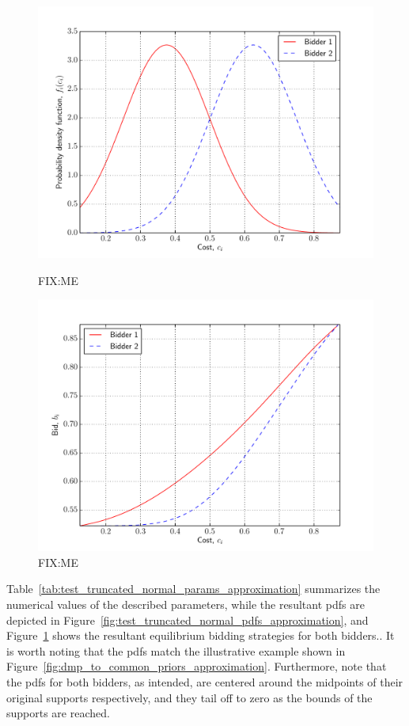 \begin{figure}[p!]
  \includegraphics[width=\figsize]{Approximation/Figures/test_truncated_normal_pdfs}
  \caption{FIX:ME}
  \label{fig:test_truncated_normal_pdfs_approximation}
  \vspace{10mm}
  \includegraphics[width=\figsize]{Approximation/Figures/test_truncated_normal_bids}
  \caption{FIX:ME}
  \label{fig:test_truncated_normal_bids_approximation}
\end{figure}

Table~\ref{tab:test_truncated_normal_params_approximation} summarizes the numerical values of the described parameters, while the resultant pdfs are depicted in Figure~\ref{fig:test_truncated_normal_pdfs_approximation}, and Figure~\ref{fig:test_truncated_normal_bids_approximation} shows the resultant equilibrium bidding strategies for both bidders.. It is worth noting that the pdfs match the illustrative example shown in Figure~\ref{fig:dmp_to_common_priors_approximation}. Furthermore, note that the pdfs for both bidders, as intended, are centered around the midpoints of their original supports respectively, and they tail off to zero as the bounds of the supports are reached.

